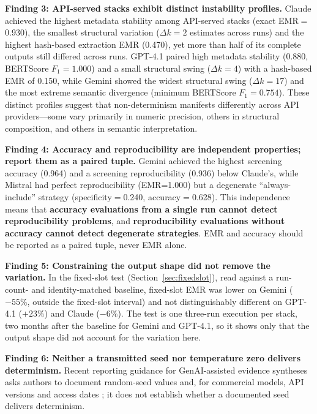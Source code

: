 \documentclass[preprint,review,12pt,authoryear]{elsarticle}
\newcommand{\emr}{\textrm{EMR}}
\begin{document}
\textbf{Finding 3: API-served stacks exhibit distinct instability profiles.}
Claude achieved the highest metadata stability among API-served stacks (exact EMR${=}$0.930), the smallest structural variation ($\Delta k{=}2$ estimates across runs) and the highest hash-based extraction EMR (0.470), yet more than half of its complete outputs still differed across runs.
GPT-4.1 paired high metadata stability (0.880, BERTScore $F_1{=}1.000$) and a small structural swing ($\Delta k{=}4$) with a hash-based EMR of 0.150, while Gemini showed the widest structural swing ($\Delta k{=}17$) and the most extreme semantic divergence (minimum BERTScore $F_1{=}0.754$).
These distinct profiles suggest that non-determinism manifests differently across API providers---some vary primarily in numeric precision, others in structural composition, and others in semantic interpretation.

\textbf{Finding 4: Accuracy and reproducibility are independent properties; report them as a paired tuple.}
\label{sec:metric_pairing}
Gemini achieved the highest screening accuracy (0.964) and a screening reproducibility (0.936) below Claude's, while Mistral had perfect reproducibility (\emr{=}1.000) but a degenerate ``always-include'' strategy (specificity${=}$0.240, accuracy${=}$0.628).
This independence means that \textbf{accuracy evaluations from a single run cannot detect reproducibility problems}, and \textbf{reproducibility evaluations without accuracy cannot detect degenerate strategies}.
EMR and accuracy should be reported as a paired tuple, never EMR alone.

\textbf{Finding 5: Constraining the output shape did not remove the variation.}
In the fixed-slot test (Section~\ref{sec:fixedslot}), read against a run-count- and identity-matched baseline, fixed-slot EMR was lower on Gemini ($-55\%$, outside the fixed-slot interval) and not distinguishably different on GPT-4.1 ($+23\%$) and Claude ($-6\%$). The test is one three-run execution per stack, two months after the baseline for Gemini and GPT-4.1, so it shows only that the output shape did not account for the variation here.

\textbf{Finding 6: Neither a transmitted seed nor temperature zero delivers determinism.}
Recent reporting guidance for GenAI-assisted evidence syntheses asks authors to document random-seed values and, for commercial models, API versions and access dates \citep{farotimi2025rsm_genai_guidance}; it does not establish whether a documented seed delivers determinism.
\end{document}
